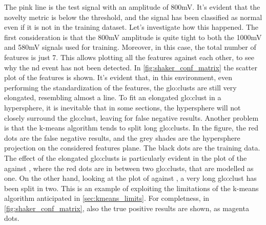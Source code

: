 The pink line is the test signal with an amplitude of 800mV. It's evident that the novelty metric is below the threshold, and the signal has been classified as normal even if it is not in the training dataset. Let's investigate how this happened. The first consideration is that the 800mV amplitude is quite tight to both the 1000mV and 580mV signals used for training. Moreover, in this case, the total number of features is just 7. This allows plotting all the features against each other, to see why the \gls{nd} event has not been detected. In \autoref{fig:shaker_conf_matrix} the scatter plot of the features is shown. It's evident that, in this environment, even performing the standardization of the features, the \gls{glo:clust}s are still very elongated, resembling almost a line. To fit an elongated \gls{glo:clust} in a hypersphere, it is inevitable that in some sections, the hypersphere will not closely surround the \gls{glo:clust}, leaving  for false negative results. Another problem is that the k-means algorithm tends to split long \gls{glo:clust}s. In the figure, the red dots are the false negative results, and the grey shades are the hypersphere projection on the considered features plane. The black dots are the training data. The effect of the elongated \gls{glo:clust}s is particularly evident in the plot of the  against , where the red dots are in between two \gls{glo:clust}s, that are modelled as one. On the other hand, looking at the plot of  against , a very long \gls{glo:clust} has been split in two. This is an example of exploiting the limitations of the k-means algorithm anticipated in \autoref{sec:kmeans_limits}. 
For completness, in \autoref{fig:shaker_conf_matrix}, also the true positive results are shown, as magenta dots.


